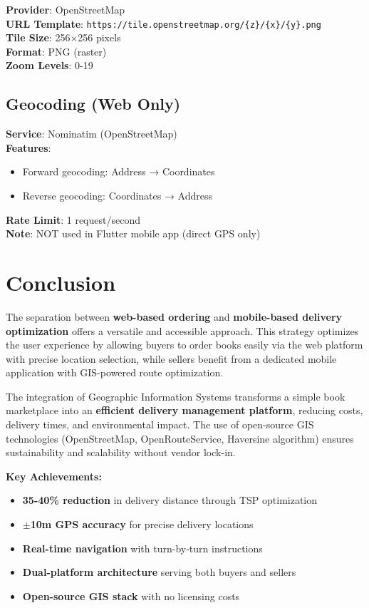 \documentclass[12pt,a4paper]{article}
\begin{document}
\textbf{Provider}: OpenStreetMap\\
\textbf{URL Template}: \texttt{https://tile.openstreetmap.org/\{z\}/\{x\}/\{y\}.png}\\
\textbf{Tile Size}: 256×256 pixels\\
\textbf{Format}: PNG (raster)\\
\textbf{Zoom Levels}: 0-19

\subsection{Geocoding (Web Only)}

\textbf{Service}: Nominatim (OpenStreetMap)\\
\textbf{Features}:
\begin{itemize}
    \item Forward geocoding: Address → Coordinates
    \item Reverse geocoding: Coordinates → Address
\end{itemize}
\textbf{Rate Limit}: 1 request/second\\
\textbf{Note}: NOT used in Flutter mobile app (direct GPS only)

\newpage

\section{Conclusion}

The separation between \textbf{web-based ordering} and \textbf{mobile-based delivery optimization} offers a versatile and accessible approach. This strategy optimizes the user experience by allowing buyers to order books easily via the web platform with precise location selection, while sellers benefit from a dedicated mobile application with GIS-powered route optimization.

The integration of Geographic Information Systems transforms a simple book marketplace into an \textbf{efficient delivery management platform}, reducing costs, delivery times, and environmental impact. The use of open-source GIS technologies (OpenStreetMap, OpenRouteService, Haversine algorithm) ensures sustainability and scalability without vendor lock-in.

\textbf{Key Achievements:}
\begin{itemize}
    \item \textbf{35-40\% reduction} in delivery distance through TSP optimization
    \item \textbf{$\pm$10m GPS accuracy} for precise delivery locations
    \item \textbf{Real-time navigation} with turn-by-turn instructions
    \item \textbf{Dual-platform architecture} serving both buyers and sellers
    \item \textbf{Open-source GIS stack} with no licensing costs
\end{itemize}
\end{document}
